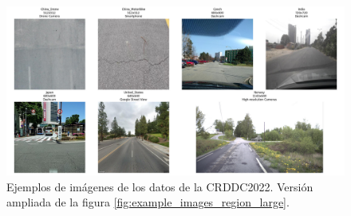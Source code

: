 \begin{figure}[H]
    \centering
    \includegraphics[width=1\textwidth]{img/example_images_regions.png}
    \caption{Ejemplos de imágenes de los datos de la CRDDC2022. Versión ampliada de la figura \ref{fig:example_images_region_large}.}
    \label{fig:example_images_region}
\end{figure}